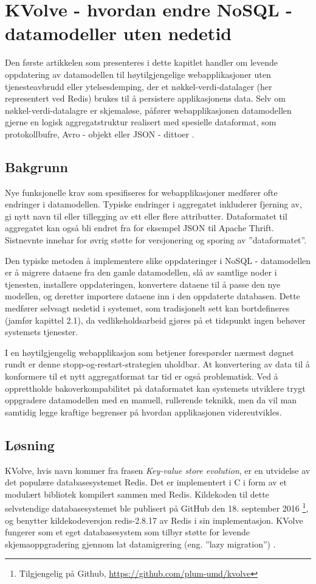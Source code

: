 \section{KVolve - hvordan endre NoSQL - datamodeller uten nedetid}

Den første artikkelen som presenteres i dette kapitlet handler om levende oppdatering av datamodellen til høytilgjengelige webapplikasjoner uten tjenesteavbrudd eller ytelsesdemping, der et nøkkel-verdi-datalager (her representert ved Redis) brukes til å persistere applikasjonens data. Selv om nøkkel-verdi-datalagre er skjemaløse, påfører webapplikasjonen datamodellen gjerne en logisk aggregatstruktur realisert med spesielle dataformat, som protokollbufre, Avro - objekt eller JSON - dittoer \citep{saur2016}.

\subsection{Bakgrunn}
Nye funksjonelle krav som spesifiseres for webapplikasjoner medfører ofte endringer i datamodellen.  Typiske endringer i aggregatet inkluderer fjerning av, gi nytt navn til eller tillegging av ett eller flere attributter. Dataformatet til aggregatet kan også bli endret fra for eksempel JSON til Apache Thrift. Sistnevnte innehar for øvrig støtte for versjonering og sporing av ''dataformatet''.

Den typiske metoden å implementere slike oppdateringer i NoSQL - datamodellen er å migrere dataene fra den gamle datamodellen, slå av samtlige noder i tjenesten, installere oppdateringen, konvertere dataene til å passe den nye modellen, og deretter importere dataene inn i den oppdaterte databasen. Dette medfører selvsagt nedetid i systemet, som tradisjonelt sett kan bortdefineres (jamfør kapittel 2.1), da vedlikeholdsarbeid gjøres på et tidspunkt ingen behøver systemets tjenester.

I en høytilgjengelig webapplikasjon som betjener forespørsler nærmest døgnet rundt er denne stopp-og-restart-strategien uholdbar. At konvertering av data til å konformere til et nytt aggregatformat tar tid er også problematisk. Ved å opprettholde bakoverkompabilitet på dataformatet kan systemets utviklere trygt oppgradere datamodellen med en manuell, rullerende teknikk, men da vil man samtidig legge kraftige begrenser på hvordan applikasjonen videreutvikles.

\subsection{Løsning}
KVolve, hvis navn kommer fra frasen \emph{Key-value store evolution}, er en utvidelse av det populære databasesystemet Redis. Det er implementert i C i form av et modulært bibliotek kompilert sammen med Redis. Kildekoden til dette selvstendige databasesystemet ble publisert på GitHub den 18. september 2016 \footnote{Tilgjengelig på Github, \url{https://github.com/plum-umd/kvolve}}, og benytter kildekodeversjon redis-2.8.17 av Redis i sin implementasjon. KVolve fungerer som et eget databasesystem som tilbyr støtte for levende skjemaoppgradering gjennom lat datamigrering (eng. ''lazy migration'') \citep{saur2016}.

